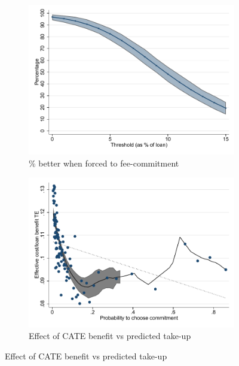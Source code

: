 \documentclass[oneside,11pt]{article}
\begin{document}
\begin{figure}[H]
\begin{center}
\begin{subfigure}{0.45\textwidth}
    \end{subfigure}
        \begin{subfigure}{0.45\textwidth}
        \caption{\% better when forced to fee-commitment}
        \centering
        \includegraphics[width=\textwidth]{Figuras/line_better_forceall_eff_te_cf.pdf}
        
    \end{subfigure}
        \begin{subfigure}{0.45\textwidth}
        \caption{\footnotesize{Effect of CATE benefit vs predicted take-up}}
        \centering
        \includegraphics[width=\textwidth]{Figuras/benefit_choice.pdf}%
    \end{subfigure}
    

\end{center}
\end{figure}
\end{document}
